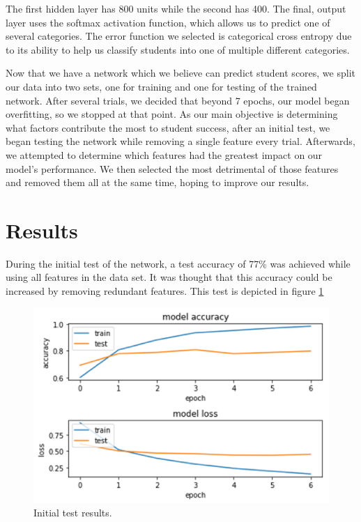 \documentclass[conference]{IEEEtran}
\begin{document}
The first hidden layer has 800 units while the second has 400. The final, output layer uses the softmax activation function, which allows us to predict one of several categories. The error function we selected is categorical cross entropy due to its ability to help us classify students into one of multiple different categories. 

Now that we have a network which we believe can predict student scores, we split our data into two sets, one for training and one for testing of the trained network. After several trials, we decided that beyond 7 epochs, our model began overfitting, so we stopped at that point. As our main objective is determining what factors contribute the most to student success, after an initial test, we began testing the network while removing a single feature every trial. Afterwards, we attempted to determine which features had the greatest impact on our model’s performance. We then selected the most detrimental of those features and removed them all at the same time, hoping to improve our results.

\section{Results}

During the initial test of the network, a test accuracy of 77\% was achieved while using all features in the data set. It was thought that this accuracy could be increased by removing redundant features. This test is depicted in figure \ref{results1}

\begin{figure}[htbp]
\centerline{\includegraphics[width=\linewidth]{results1.png}}
\caption{Initial test results.}
\label{results1}
\end{figure}
\end{document}
